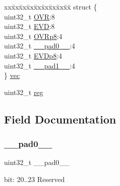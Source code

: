 \begin{DoxyCompactItemize}
\begin{tabbing}
\end{tabbing}\item 
\begin{tabbing}
xx\=xx\=xx\=xx\=xx\=xx\=xx\=xx\=xx\=\kill
struct \{\\
\>uint32\_t \mbox{\hyperlink{union_e_v_s_y_s___i_n_t_e_n_c_l_r___type_a89687389646540280d33d90ddd04812d}{OVR}}:8\\
\>uint32\_t \mbox{\hyperlink{union_e_v_s_y_s___i_n_t_e_n_c_l_r___type_aa536a4aac53f81914dc569bf2aecf5d1}{EVD}}:8\\
\>uint32\_t \mbox{\hyperlink{union_e_v_s_y_s___i_n_t_e_n_c_l_r___type_a107b1d8f96371c7b3eff3719946daaeb}{OVRp8}}:4\\
\>uint32\_t \mbox{\hyperlink{union_e_v_s_y_s___i_n_t_e_n_c_l_r___type_a3e57c2ef1c3ffb36722f000cc1156824}{\_\_pad0\_\_}}:4\\
\>uint32\_t \mbox{\hyperlink{union_e_v_s_y_s___i_n_t_e_n_c_l_r___type_a7b62a828345e9dc20a51686cefefae42}{EVDp8}}:4\\
\>uint32\_t \mbox{\hyperlink{union_e_v_s_y_s___i_n_t_e_n_c_l_r___type_a6712ba6dd1d5b43d2d56ff8ac4e275a7}{\_\_pad1\_\_}}:4\\
\} \mbox{\hyperlink{union_e_v_s_y_s___i_n_t_e_n_c_l_r___type_a1c37713f2c67a192c0317d48f4183982}{vec}}\\

\end{tabbing}\item 
uint32\+\_\+t \mbox{\hyperlink{union_e_v_s_y_s___i_n_t_e_n_c_l_r___type_a6b91636401516a477989a336376d7b40}{reg}}
\end{DoxyCompactItemize}


\subsection{Field Documentation}
\mbox{\label{union_e_v_s_y_s___i_n_t_e_n_c_l_r___type_a3e57c2ef1c3ffb36722f000cc1156824}} 
\subsubsection{\texorpdfstring{\_\_pad0\_\_}{\_\_pad0\_\_}}
{\footnotesize\ttfamily uint32\+\_\+t \+\_\+\+\_\+pad0\+\_\+\+\_\+}

bit\+: 20..23 Reserved \mbox{\label{union_e_v_s_y_s___i_n_t_e_n_c_l_r___type_a6712ba6dd1d5b43d2d56ff8ac4e275a7}} 
